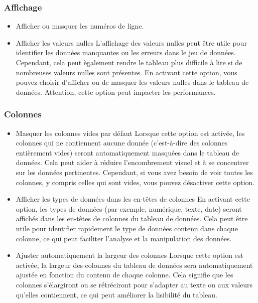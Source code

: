 \documentclass[11pt,a4paper]{article}
\begin{document}
\subsubsection*{Affichage}
\begin{itemize}
  \item Afficher ou masquer les num\'eros de ligne.
  \item Afficher les valeurs nulles
  \newline L'affichage des valeurs nulles peut \^etre utile pour identifier les donn\'ees manquantes ou les erreurs dans le jeu de donn\'ees. Cependant, cela peut \`egalement rendre le tableau plus difficile \`a lire si de nombreuses valeurs nulles sont pr\'esentes. En activant cette option, vous pouvez choisir d'afficher ou de masquer les valeurs nulles dans le tableau de donn\'ees. Attention, cette option peut impacter les performances.
\end{itemize}

\subsubsection*{Colonnes}
\begin{itemize}
  \item Masquer les colonnes vides par d\'efaut
  \newline Lorsque cette option est activ\'ee, les colonnes qui ne contiennent aucune donn\'ee (c'est-\`a-dire des colonnes enti\`erement vides) seront automatiquement masqu\'ees dans le tableau de donn\'ees. Cela peut aider \`a r\'eduire l'encombrement visuel et \`a se concentrer sur les donn\'ees pertinentes. Cependant, si vous avez besoin de voir toutes les colonnes, y compris celles qui sont vides, vous pouvez d\'esactiver cette option.
  \item Afficher les types de donn\'ees dans les en-t\^etes de colonnes
  \newline En activant cette option, les types de donn\'ees (par exemple, num\'erique, texte, date) seront affich\'es dans les en-t\^etes de colonnes du tableau de donn\'ees. Cela peut \^etre utile pour identifier rapidement le type de donn\'ees contenu dans chaque colonne, ce qui peut faciliter l'analyse et la manipulation des donn\'ees.
  \item Ajuster automatiquement la largeur des colonnes
  \newline Lorsque cette option est activ\'ee, la largeur des colonnes du tableau de donn\'ees sera automatiquement ajust\'ee en fonction du contenu de chaque colonne. Cela signifie que les colonnes s'\'elargiront ou se r\'etr\'eciront pour s'adapter au texte ou aux valeurs qu'elles contiennent, ce qui peut am\'eliorer la lisibilit\'e du tableau.
\end{itemize}
\end{document}
